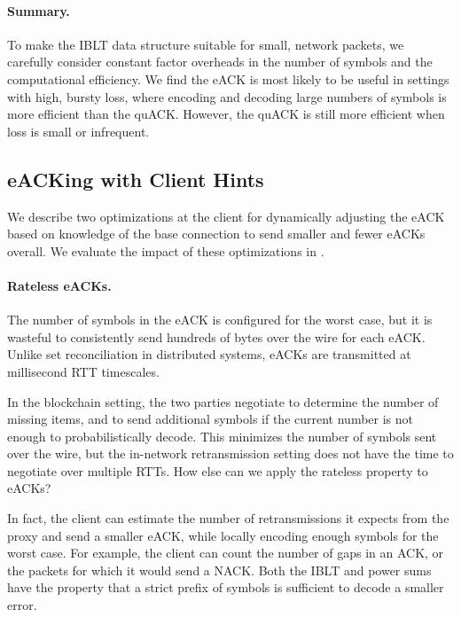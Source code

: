 \paragraph{Summary.}

To make the IBLT data structure suitable for small, network packets, we
carefully consider constant factor overheads in the
number of symbols and the computational efficiency. We find the eACK
is most likely to be useful in settings with high, bursty loss, where
encoding and decoding large numbers of symbols is more efficient than the
quACK. However, the quACK is still more efficient when
loss is small or infrequent.

\subsection{eACKing with Client Hints}
\label{sec:eack:hints}

We describe two optimizations at the client for dynamically adjusting the eACK
based on knowledge of the base connection to send smaller and fewer eACKs
overall.
We evaluate the impact of these optimizations in .

\paragraph{Rateless eACKs.} The number of symbols in the eACK is configured
 for the worst case, but it is wasteful to consistently send hundreds of bytes
 over the wire for each eACK. Unlike set reconciliation in distributed
 systems, eACKs are transmitted at millisecond RTT timescales.

In the blockchain setting, the two parties negotiate to determine the number of
missing items, and to send additional symbols if the current number is not
enough to probabilistically decode. This minimizes the number of symbols sent
over the wire, but the in-network retransmission setting does not have the time
to negotiate over multiple RTTs. How else can we apply the rateless property to
eACKs?

In fact, the client can estimate the number of retransmissions it expects from
the proxy and send a smaller eACK, while locally encoding enough symbols for
the worst case. For example, the client can count the number of gaps in an ACK,
or the packets for which it would send a NACK. Both the IBLT and power sums
have the property that a strict prefix of symbols is sufficient to decode a
smaller error.

